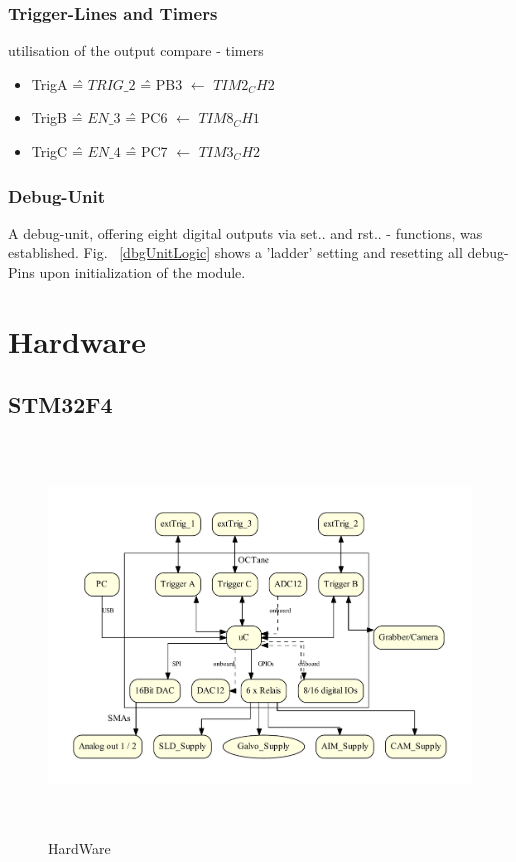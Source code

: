 \documentclass[master,english,smartquotes,apa]{hgbthesis}
\begin{document}
		\subsubsection{Trigger-Lines and Timers}
		utilisation of the output compare - timers
		\begin{itemize}
			\item TrigA \^{=} $TRIG\_2$  \^{=} PB3 $\leftarrow$ $TIM2_CH2$
			\item TrigB \^{=} $EN\_3$    \^{=} PC6 $\leftarrow$ $TIM8_CH1$
			\item TrigC \^{=} $EN\_4$    \^{=} PC7 $\leftarrow$ $TIM3_CH2$
		\end{itemize}
		\subsubsection{Debug-Unit}
		A debug-unit, offering eight digital outputs via set.. and rst.. - functions, was established. Fig. ~\ref{dbgUnitLogic} shows a 'ladder' setting and resetting all debug-Pins upon initialization of the module.
		

		
		
		\section{Hardware}
			\subsection{STM32F4}
			\begin{figure}[ht]
				\centering
				\includegraphics[height=105mm]{src/_Octane_HW-Structure.pdf}
				\caption{HardWare}
				\label{_Octane_HW-Structure.pdf}
			\end{figure}
			
\end{document}
